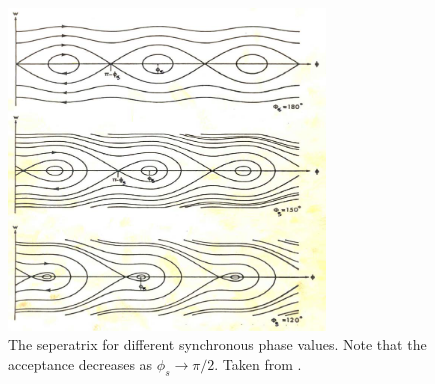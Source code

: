 \begin{figure}
\begin{center}
\includegraphics[width=0.75\textwidth]{appendices/figures/longPhaseDiag.png}
\end{center}
\caption{The seperatrix for different synchronous phase values. Note that the acceptance decreases as $\phi_{s} \rightarrow \pi / 2$. Taken from \cite{Leduff:LongDyn}.}
\label{fig:longSynFreq}
\end{figure}
